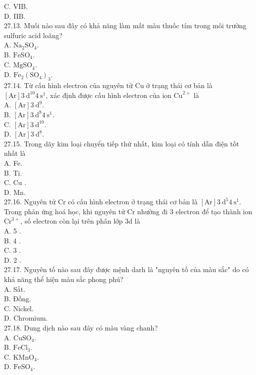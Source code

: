 \documentclass[10pt]{article}
\begin{document}
C. VIB.\\
D. IIB.\\
27.13. Muối nào sau đây có khả năng làm mất màu thuốc tím trong môi trường sulfuric acid loãng?\\
A. $\mathrm{Na}_{2} \mathrm{SO}_{4}$.\\
B. $\mathrm{FeSO}_{4}$.\\
C. $\mathrm{MgSO}_{4}$.\\
D. $\mathrm{Fe}_{2}\left(\mathrm{SO}_{4}\right)_{3}$.\\
27.14. Từ cấu hình electron của nguyên tữ Cu ở trạng thái cơ bản là $[\mathrm{Ar}] 3 \mathrm{~d}^{10} 4 \mathrm{~s}^{1}$, xác định được cấu hình electron của ion $\mathrm{Cu}^{2+}$ là\\
A. $[\mathrm{Ar}] 3 \mathrm{~d}^{9}$.\\
B. $[\mathrm{Ar}] 3 \mathrm{~d}^{8} 4 \mathrm{~s}^{1}$.\\
C. $[\mathrm{Ar}] 3 \mathrm{~d}^{10}$.\\
D. $[\mathrm{Ar}] 3 \mathrm{~d}^{8}$.\\
27.15. Trong dãy kim loại chuyển tiếp thứ nhất, kim loại có tính dẫn điện tốt nhất là\\
A. Fe.\\
B. Ti.\\
C. Cu .\\
D. Mn.\\
27.16. Nguyên tử Cr có cấu hình electron ở trạng thái cơ bản là $[\mathrm{Ar}] 3 \mathrm{~d}^{5} 4 \mathrm{~s}^{1}$. Trong phản ứng hoá học, khi nguyên tử Cr nhường đi 3 electron để tạo thành ion $\mathrm{Cr}^{3+}$, số electron còn lại trên phân lớp 3d là\\
A. 5 .\\
B. 4 .\\
C. 3 .\\
D. 2 .\\
27.17. Nguyên tố nào sau đây được mệnh darh là "nguyên tố của màu sắc" do có khả năng thể hiện màu sắc phong phú?\\
A. Sắt.\\
B. Đồng.\\
C. Nickel.\\
D. Chromium.\\
27.18. Dung dịch nào sau đây có màu vàng chanh?\\
A. $\mathrm{CuSO}_{4}$.\\
B. $\mathrm{FeCl}_{3}$.\\
C. $\mathrm{KMnO}_{4}$.\\
D. $\mathrm{FeSO}_{4}$.\\
\end{document}
